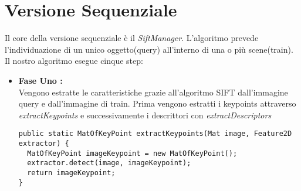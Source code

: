 \section{Versione Sequenziale}
Il core della versione sequenziale è il \emph{\textit{SiftManager}}. L'algoritmo prevede l'individuazione di un unico oggetto(query) all'interno di una o più scene(train). Il nostro algoritmo esegue cinque step:
\begin{itemize}
	\item \textbf{Fase Uno :}\\
	Vengono estratte le caratteristiche grazie all'algoritmo SIFT dall'immagine query e dall'immagine di train.
	      Prima vengono estratti i keypoints attraverso \emph{\textit{extractKeypoints}} e successivamente i descrittori con \emph{\textit{extractDescriptors}}
\begin{lstlisting}
public static MatOfKeyPoint extractKeypoints(Mat image, Feature2D extractor) {
  MatOfKeyPoint imageKeypoint = new MatOfKeyPoint();
  extractor.detect(image, imageKeypoint);
  return imageKeypoint;
}
	      

\end{lstlisting}
\end{itemize}
